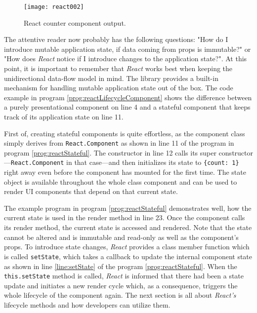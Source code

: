 \begin{figure}
  \centering
  \texttt{[image: react002]}
  \caption{React counter component output.}
  \label{fig:reactCounterComponent}
\end{figure}

The attentive reader now probably has the following questions: "How do I introduce mutable application state, if data coming from props is immutable?" or "How does \emph{React} notice if I introduce changes to the application state?". At this point, it is important to remember that \emph{React} works best when keeping the unidirectional data-flow model in mind. The library provides a built-in mechanism for handling mutable application state out of the box. The code example in program \ref{prog:reactLifecycleComponent} shows the difference between a purely presentational component on line 4 and a stateful component that keeps track of its application state on line 11.

First of, creating stateful components is quite effortless, as the component class simply derives from \texttt{React.Component} as shown in line 11 of the program in program \ref{prog:reactStateful}. The constructor in line 12 calls its super constructor---\texttt{React.Component} in that case---and then initializes its state to \texttt{\{count: 1\}} right away even before the component has mounted for the first time. The state object is available throughout the whole class component and can be used to render UI components that depend on that current state.

The example program in program \ref{prog:reactStateful} demonstrates well, how the current state is used in the render method in line 23. Once the component calls its render method, the current state is accessed and rendered. Note that the state cannot be altered and is immutable and read-only as well as the component's props. To introduce state changes, \emph{React} provides a class member function which is called \texttt{setState}, which takes a callback to update the internal component state as shown in line \ref{line:setState} of the program \ref{prog:reactStateful}. When the \texttt{this.setState} method is called, \emph{React} is informed that there had been a state update and initiates a new render cycle which, as a consequence, triggers the whole lifecycle of the component again. The next section is all about \emph{React's} lifecycle methods and how developers can utilize them.


